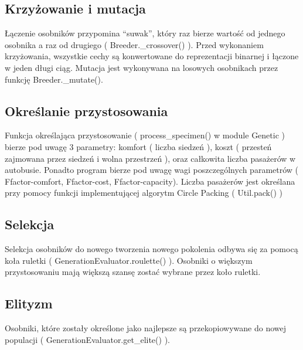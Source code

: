 \documentclass[bibtotocnumbered, headsepline,normalheadings,12pt,polish]{scrreprt}
\begin{document}
\subsection{Krzyżowanie i mutacja}
Łączenie osobników przypomina ``suwak'', który raz bierze wartość od jednego osobnika a raz od drugiego ( Breeder.\_crossover() ). Przed wykonaniem krzyżowania, wszystkie cechy są konwertowane do reprezentacji binarnej i łączone w jeden długi ciąg. Mutacja jest wykonywana na losowych osobnikach przez funkcję Breeder.\_mutate().

\subsection{Określanie przystosowania}
Funkcja określająca przystosowanie ( process\_specimen() w module Genetic ) bierze pod uwagę 3 parametry: komfort ( liczba siedzeń ), koszt ( przesteń zajmowana przez siedzeń i wolna przestrzeń ), oraz całkowita liczba pasażerów w autobusie. Ponadto program bierze pod uwagę wagi poszczególnych parametrów ( Ffactor-comfort, Ffactor-cost, Ffactor-capacity).
Liczba pasażerów jest określana przy pomocy funkcji implementującej algorytm Circle Packing ( Util.pack() )

\subsection{Selekcja}
Selekcja osobników do nowego tworzenia nowego pokolenia odbywa się za pomocą koła ruletki ( GenerationEvaluator.roulette() ). Osobniki o większym przystosowaniu mają większą szansę zostać wybrane przez koło ruletki.
\subsection{Elityzm}
Osobniki, które zostały określone jako najlepsze są przekopiowywane do nowej populacji ( GenerationEvaluator.get\_elite() ).
\end{document}
